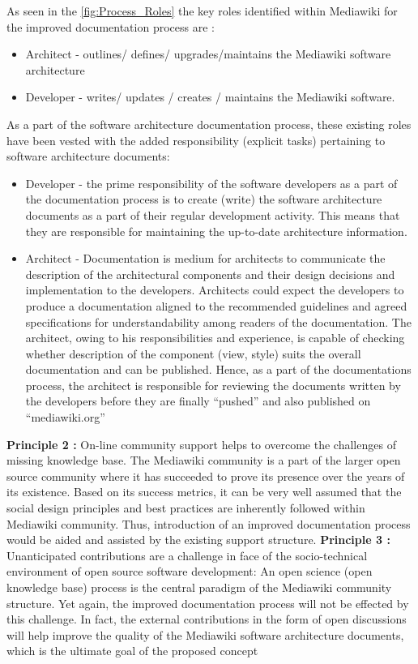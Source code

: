 As seen in the \autoref{fig:Process_Roles} the key roles identified within Mediawiki for the improved documentation process are :
\begin{itemize}
\item Architect - outlines/ defines/ upgrades/maintains the Mediawiki software architecture
\item Developer - writes/ updates / creates / maintains the Mediawiki software.
\end{itemize}
As a part of the software architecture documentation process, these existing roles have been vested with the added responsibility (explicit tasks) pertaining to software architecture documents:
\begin{itemize}
\item Developer - the prime responsibility of the software developers as a part of the documentation process is to create (write) the software architecture documents as a part of their regular development activity. This means that they are responsible for maintaining the up-to-date architecture information.
\item Architect - Documentation is medium for architects to communicate the description of the architectural components and their design decisions and implementation to the developers. Architects could expect the developers to produce a documentation aligned to the recommended guidelines and agreed specifications for understandability among readers of the documentation. The architect, owing to his responsibilities and experience, is capable of checking whether description of the component (view, style) suits the overall documentation and can be published. Hence, as a part of the documentations process, the architect is responsible for reviewing the documents written by the developers before they are finally \enquote{pushed} and also published on \enquote{mediawiki.org}

\end{itemize}

\textbf{Principle 2 : }On-line community support helps to overcome the challenges of missing knowledge base.  
\indent The Mediawiki community is a part of the larger open source community where it has succeeded to prove its presence over the years of its existence. Based on its success metrics, it can be very well assumed that the social design principles and best practices are inherently followed within Mediawiki community. Thus, introduction of an improved documentation process would be aided and assisted by the existing support structure.
\newline \newline
\textbf{Principle 3 : } Unanticipated contributions are a challenge in face of the socio-technical environment of open source software development:
\indent An open science (open knowledge base) process is the central paradigm of the Mediawiki community structure. Yet again, the improved documentation process will not be effected by this challenge. In fact, the external contributions in the form of open discussions will help improve the quality of the Mediawiki software architecture documents, which is the ultimate goal of the proposed concept


